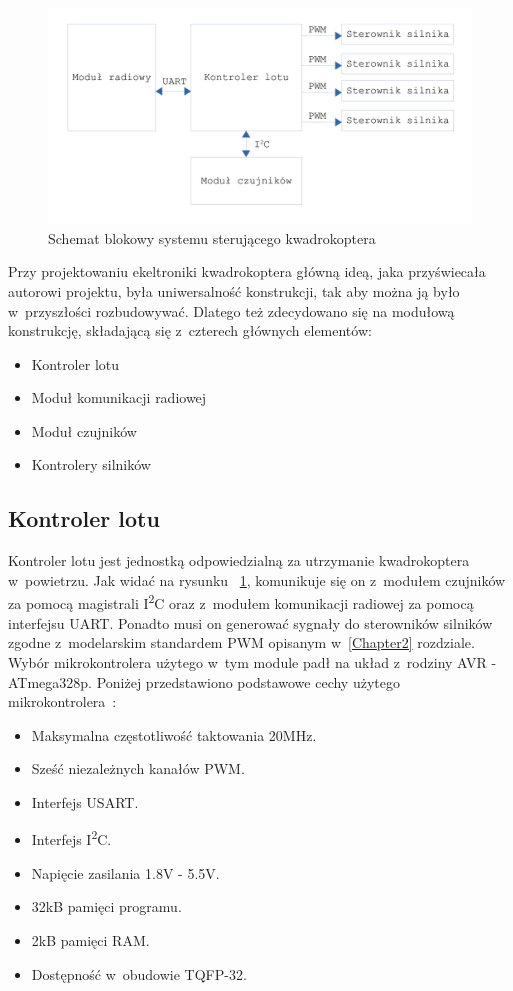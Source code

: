 \documentclass[11pt, twoside]{Thesis} %
\begin{document}
\begin{figure}[H]
	\centering
	\includegraphics[scale=0.1]{Pictures/QuadroSchematIdeowy.png}
	\caption[Schemat blokowy kwadrokoptera]{Schemat blokowy systemu sterującego kwadrokoptera}
	\label{fig:QuadroSchematIdeowy}
\end{figure}

Przy projektowaniu ekeltroniki kwadrokoptera główną ideą, jaka przyświecała autorowi projektu, była uniwersalność konstrukcji, tak aby można ją było w~przyszłości rozbudowywać. Dlatego też zdecydowano się na modułową konstrukcję, składającą się z~czterech głównych elementów:
\begin{itemize}
	\item Kontroler lotu
	\item Moduł komunikacji radiowej
	\item Moduł czujników
	\item Kontrolery silników
\end{itemize}

\subsection{Kontroler lotu}
Kontroler lotu jest jednostką odpowiedzialną za utrzymanie kwadrokoptera w~powietrzu. Jak widać na rysunku ~\ref{fig:QuadroSchematIdeowy}, komunikuje się on z~modułem czujników za pomocą magistrali I\textsuperscript{2}C oraz z~modułem komunikacji radiowej za pomocą interfejsu UART. Ponadto musi on generować sygnały do sterowników silników zgodne z~modelarskim standardem PWM opisanym w~\ref{Chapter2} rozdziale. Wybór mikrokontrolera użytego w~tym module padł na układ z~rodziny AVR - ATmega328p. Poniżej przedstawiono podstawowe cechy użytego mikrokontrolera~\cite{ds_atmega328p}:

\begin{itemize}
	\item Maksymalna częstotliwość taktowania 20MHz.
	\item Sześć niezależnych kanałów PWM.
	\item Interfejs USART.
	\item Interfejs I\textsuperscript{2}C.
	\item Napięcie zasilania 1.8V - 5.5V.
	\item 32kB pamięci programu.
	\item 2kB pamięci RAM.
	\item Dostępność w~obudowie TQFP-32.
\end{itemize}
\end{document}
